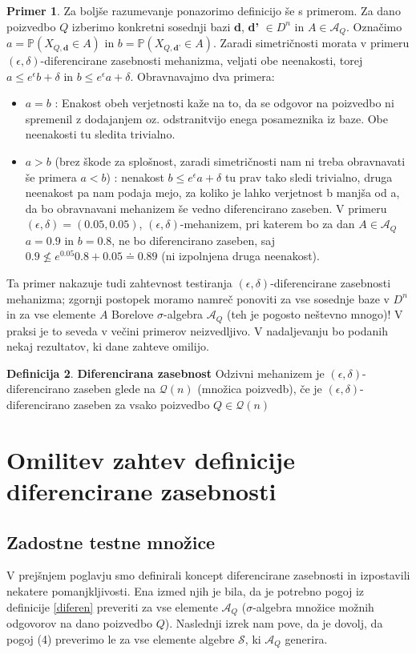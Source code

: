 \documentclass[12pt,a4paper]{amsart}
\theoremstyle{definition} %
\newtheorem{definicija}{Definicija}[section]
\newtheorem{primer}[definicija]{Primer}
\theoremstyle{plain} %
\begin{document}
\begin{primer}
Za boljše razumevanje ponazorimo definicijo še s primerom. Za dano poizvedbo $Q$ izberimo konkretni sosednji bazi \textbf{d}, \textbf{d'} $\in D^n$ in $A\in \mathcal{A}_{Q}$. Označimo $a = \mathbb{P}(X_{Q,\textbf{d}}\in A)$ in $b = \mathbb{P}(X_{Q,\textbf{d'}}\in A)$. Zaradi simetričnosti morata v primeru $(\epsilon, \delta)$-diferencirane zasebnosti mehanizma, veljati obe neenakosti, torej $a \leq e^{\epsilon}b+\delta$ in $b \leq e^{\epsilon}a+\delta$. Obravnavajmo dva primera:
\begin{itemize}
\item $a=b$ : Enakost obeh verjetnosti kaže na to, da se odgovor na poizvedbo ni spremenil z dodajanjem oz. odstranitvijo enega posameznika iz baze. Obe neenakosti tu sledita trivialno.
\item $a>b$ (brez škode za splošnost, zaradi simetričnosti nam ni treba obravnavati še primera $a<b$) : nenakost $b \leq e^{\epsilon}a+\delta$ tu prav tako sledi trivialno, druga neenakost pa nam podaja mejo, za koliko je lahko verjetnost b manjša od a, da bo obravnavani mehanizem še vedno diferencirano zaseben. V primeru $(\epsilon, \delta) = (0.05, 0.05)$, $(\epsilon, \delta)$-mehanizem, pri katerem bo za dan $A \in \mathcal{A}_{Q}$ $a=0.9$ in $b=0.8$, ne bo diferencirano zaseben, saj $0.9 \nleq e^{0.05} 0.8 + 0.05 \doteq 0.89$ (ni izpolnjena druga neenakost).
\end{itemize}
Ta primer nakazuje tudi zahtevnost testiranja $(\epsilon, \delta)$-diferencirane zasebnosti mehanizma; zgornji postopek moramo namreč ponoviti za vse sosednje baze v $D^n$ in za vse elemente $A$ Borelove $\sigma$-algebra $\mathcal{A}_Q$ (teh je pogosto neštevno mnogo)! V praksi je to seveda v večini primerov neizvedljivo. V nadaljevanju bo podanih nekaj rezultatov, ki dane zahteve omilijo.
\end{primer}


\begin{definicija} {\textbf{Diferencirana zasebnost}}
Odzivni mehanizem je $(\epsilon, \delta)$-diferencirano zaseben glede na $\mathcal{Q}(n)$ (množica poizvedb), če je $(\epsilon, \delta)$-diferencirano zaseben za vsako poizvedbo $Q \in \mathcal{Q}(n)$
\end{definicija}

\section{Omilitev zahtev definicije diferencirane zasebnosti}
\subsection{Zadostne testne množice}
V prejšnjem poglavju smo definirali koncept diferencirane zasebnosti in izpostavili nekatere pomanjkljivosti. Ena izmed njih je bila, da je potrebno pogoj iz definicije \eqref{diferen} preveriti za vse elemente $\mathcal{A}_Q$ ($\sigma$-algebra množice možnih odgovorov na dano poizvedbo $Q$). Naslednji izrek nam pove, da je dovolj, da pogoj (4) preverimo le za vse elemente algebre $\mathcal{S}$, ki $\mathcal{A}_Q$ generira.
\end{document}
